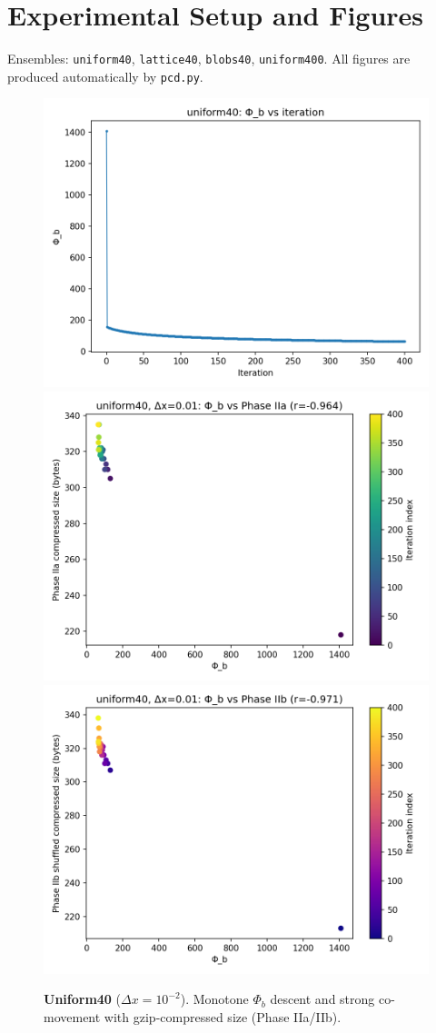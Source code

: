 \documentclass[11pt,a4paper]{article}
\numberwithin{equation}{section}
\newcommand{\phib}{\Phi_b}
\begin{document}
\section{Experimental Setup and Figures}
Ensembles: \texttt{uniform40}, \texttt{lattice40}, \texttt{blobs40}, \texttt{uniform400}.  
All figures are produced automatically by \texttt{pcd.py}.

\begin{figure}[htbp]
\centering
\includegraphics[width=0.32\linewidth]{figures/uniform40_dx0.01_phib_vs_iter.png}
\includegraphics[width=0.32\linewidth]{figures/uniform40_dx0.01_phib_vs_phase2a.png}
\includegraphics[width=0.32\linewidth]{figures/uniform40_dx0.01_phib_vs_phase2b.png}
\caption{\textbf{Uniform40} ($\Delta x{=}10^{-2}$). Monotone $\phib$ descent and strong co-movement with gzip-compressed size (Phase IIa/IIb).}
\end{figure}
\end{document}
